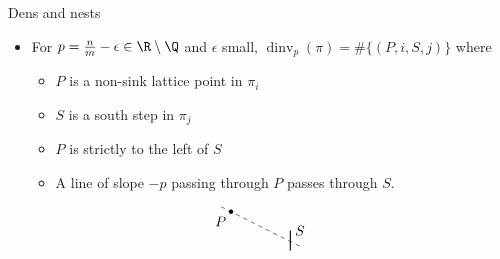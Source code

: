 \documentclass{beamer}
\DeclareMathOperator{\dinv}{dinv}
\newcounter{c}
\begin{document}
\begin{frame}{Dens and nests}
  \begin{itemize}
  \item For \(p=\frac{n}{m}-\epsilon \in \R \setminus \Q\) and
    \(\epsilon\) small, \(\dinv_p(\pi) = \#\{(P,i,S,j)\}\) where\pause
    \begin{itemize}
    \item \(P\) is a non-sink lattice point in \(\pi_i\)
    \item \(S\) is a south step in \(\pi_j\)
    \item \(P\) is strictly to the left of \(S\)
    \item A line of slope \(-p\) passing through \(P\) passes through \(S\).
    \end{itemize}
  \end{itemize}\pause
  \[
\begin{array}{c}
\begin{tikzpicture}[scale=.5,]
\draw [thick] (3,-.2) -- (3,.8);
\node [right] at (3,.8) {$S$};
\draw [dashed] (-.5,2) -- (3.5,0);
\draw [fill] (0,1.75) circle (.1);
\node [below left] at (0,1.75) {$P$};
\end{tikzpicture}
\end{array}
\]
\end{frame}
\end{document}

